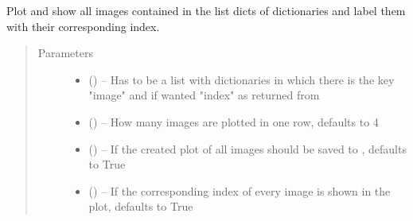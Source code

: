 \documentclass[letterpaper,10pt,english]{sphinxmanual}
\begin{document}
\begin{fulllineitems}

\begin{fulllineitems}
\label{\detokenize{index:dataset.dataset_cuboids.plot_images}}
Plot and show all images contained in the list dicts of dictionaries and label them with their corresponding index.
\begin{quote}\begin{description}
\item[{Parameters}] \leavevmode\begin{itemize}
\item {} 
 () -- Has to be a list with dictionaries in which there is the key "image" and if wanted "index" as returned from {\hyperref[\detokenize{index:dataset.dataset_cuboids.parameters_to_finished_data}]{}}

\item {} 
 (\sphinxstyleliteralemphasis{\sphinxupquote{, }}) -- How many images are plotted in one row, defaults to 4

\item {} 
 (\sphinxstyleliteralemphasis{\sphinxupquote{, }}) -- If the created plot of all images should be saved to , defaults to True

\item {} 
 (\sphinxstyleliteralemphasis{\sphinxupquote{, }}) -- If the corresponding index of every image is shown in the plot, defaults to True

\end{itemize}

\end{description}\end{quote}


\end{fulllineitems}
\end{fulllineitems}
\end{document}
